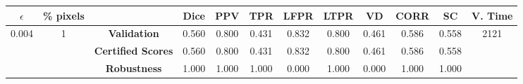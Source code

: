 \begin{longtable}{ c  c | c | c  c  c  c  c  c  c c c}
\toprule \textbf{$\epsilon$} & \textbf{\% pixels} & & \textbf{Dice} & \textbf{PPV} & \textbf{TPR} & \textbf{LFPR} & \textbf{LTPR} & \textbf{VD} & \textbf{CORR} & \textbf{SC} & \textbf{V. Time} \\
\midrule 
\multirow{3}{*}{0.004}  & \multirow{3}{*}{1} &\textbf{Validation} & 0.560 & 0.800 & 0.431 & 0.832 & 0.800 & 0.461 & 0.586 & 0.558 & \multirow{3}{*}{2121} \\
 & & \textbf{Certified Scores} & 0.560 & 0.800 & 0.431 & 0.832 & 0.800 & 0.461 & 0.586 & 0.558 & \\
& & \textbf{Robustness} & 1.000 & 1.000 & 1.000 & 0.000 & 1.000 & 0.000 & 1.000 & 1.000 & \\
\end{longtable}